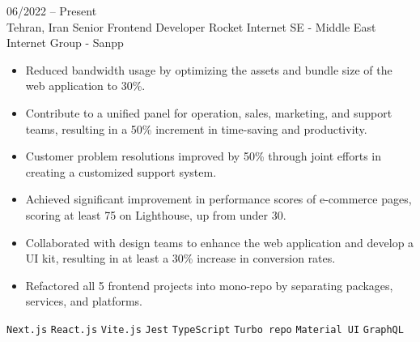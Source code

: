\documentclass[8pt]{developercv} %
\begin{document}
    \vspace{-10 pt}
    \begin{entrylist}
        \entry
        {06/2022 -- Present \\ Tehran, Iran}
        {Senior Frontend Developer}
        {Rocket Internet SE - Middle East Internet Group - Sanpp}
        {\vspace{-10pt}
            \begin{itemize}[noitemsep,topsep=0pt,parsep=0pt,partopsep=0pt, leftmargin=-1pt]
                \item Reduced bandwidth usage by optimizing the assets and bundle size of the web application to 30\%.
                \item Contribute to a unified panel for operation, sales, marketing, and support teams, resulting in a 50\% increment in time-saving and productivity.
                \item Customer problem resolutions improved by 50\% through joint efforts in creating a customized support system.
                \item Achieved significant improvement in performance scores of e-commerce pages, scoring at least 75 on Lighthouse, up from under 30.
                \item Collaborated with design teams to enhance the web application and develop a UI kit, resulting in at least a 30\% increase in conversion rates.
                \item Refactored all 5 frontend projects into mono-repo by separating packages, services, and platforms.
            \end{itemize}
            \texttt{Next.js} \slashsep \texttt{React.js} \slashsep \texttt{Vite.js} \slashsep \texttt{Jest} \slashsep \texttt{TypeScript} \slashsep \texttt{Turbo repo} \slashsep \texttt{Material UI} \slashsep \texttt{GraphQL}
        }


\end{entrylist}
\end{document}
